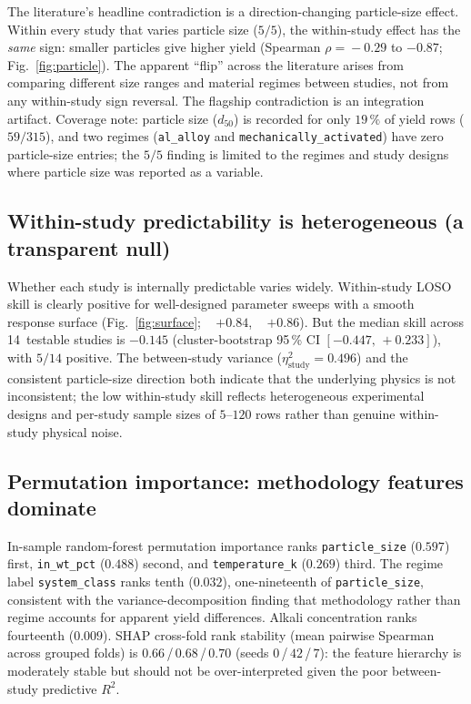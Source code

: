 The literature's headline contradiction is a direction-changing particle-size effect.
Within every study that varies particle size ($5/5$), the within-study effect has the
\emph{same} sign: smaller particles give higher yield (Spearman $\rho\!=\!-0.29$
to $-0.87$; Fig.~\ref{fig:particle}). The apparent ``flip'' across the literature
arises from comparing different size ranges and material regimes between studies, not
from any within-study sign reversal. The flagship contradiction is an integration
artifact. Coverage note: particle size ($d_{50}$) is recorded for only $19\,\%$ of
yield rows ($59/315$), and two regimes (\texttt{al\_alloy} and
\texttt{mechanically\_activated}) have zero particle-size entries; the $5/5$ finding
is limited to the regimes and study designs where particle size was reported as a
variable.

\subsection{Within-study predictability is heterogeneous (a transparent null)}

Whether each study is internally predictable varies widely. Within-study LOSO skill is
clearly positive for well-designed parameter sweeps with a smooth response surface
(Fig.~\ref{fig:surface}; \citeauthor{qiao2019}~\cite{qiao2019} $+0.84$,
\citeauthor{zhang2024}~\cite{zhang2024} $+0.86$). But the median skill across 14~testable
studies is $-0.145$ (cluster-bootstrap 95\,\% CI $[-0.447,\,+0.233]$), with $5/14$
positive. The between-study variance ($\eta^2_{\text{study}}\!=\!0.496$) and the consistent
particle-size direction both indicate that the underlying physics is not inconsistent;
the low within-study skill reflects heterogeneous experimental designs and per-study
sample sizes of $5$--$120$ rows rather than genuine within-study physical noise.

\subsection{Permutation importance: methodology features dominate}

In-sample random-forest permutation importance ranks \texttt{particle\_size} ($0.597$)
first, \texttt{in\_wt\_pct} ($0.488$) second, and \texttt{temperature\_k} ($0.269$) third.
The regime label \texttt{system\_class} ranks tenth ($0.032$), one-nineteenth of
\texttt{particle\_size}, consistent with the variance-decomposition finding that
methodology rather than regime accounts for apparent yield differences. Alkali concentration
ranks fourteenth ($0.009$). SHAP cross-fold rank stability (mean pairwise Spearman across
grouped folds) is $0.66$\,/\,$0.68$\,/\,$0.70$ (seeds $0$\,/\,$42$\,/\,$7$): the feature
hierarchy is moderately stable but should not be over-interpreted given the poor
between-study predictive $R^2$.

